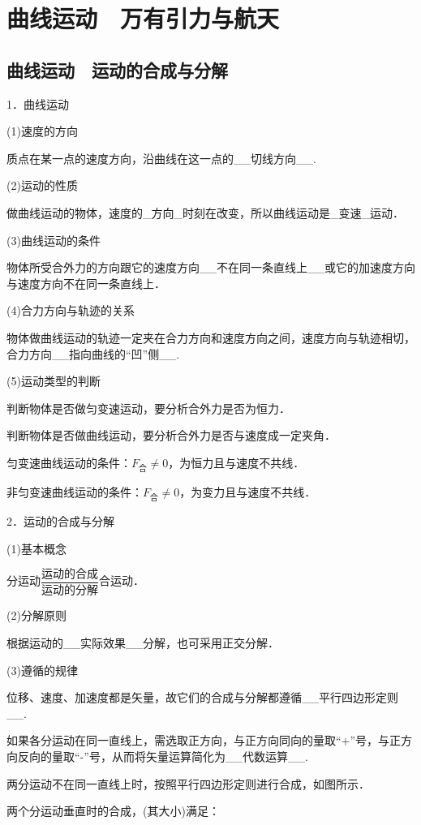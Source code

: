 \chapter{曲线运动　万有引力与航天}
\section{曲线运动　运动的合成与分解}


1．曲线运动

(1)速度的方向

质点在某一点的速度方向，沿曲线在这一点的\_\_切线方向\_\_.

(2)运动的性质

做曲线运动的物体，速度的\_方向\_时刻在改变，所以曲线运动是\_变速\_运动．

(3)曲线运动的条件

物体所受合外力的方向跟它的速度方向\_\_不在同一条直线上\_\_或它的加速度方向与速度方向不在同一条直线上．

(4)合力方向与轨迹的关系

物体做曲线运动的轨迹一定夹在合力方向和速度方向之间，速度方向与轨迹相切，合力方向\_\_指向曲线的``凹''侧\_\_.

(5)运动类型的判断

判断物体是否做匀变速运动，要分析合外力是否为恒力．

判断物体是否做曲线运动，要分析合外力是否与速度成一定夹角．

匀变速曲线运动的条件：$F_{\text{合}}\neq 0$，为恒力且与速度不共线．

非匀变速曲线运动的条件：$F_{\text{合}}\neq 0$，为变力且与速度不共线．

2．运动的合成与分解

(1)基本概念

分运动$\dfrac{\text{运动的合成}}{\text{运动的分解}}$合运动．

(2)分解原则

根据运动的\_\_实际效果\_\_分解，也可采用正交分解．

(3)遵循的规律

位移、速度、加速度都是矢量，故它们的合成与分解都遵循\_\_平行四边形定则\_\_.

如果各分运动在同一直线上，需选取正方向，与正方向同向的量取``+''号，与正方向反向的量取``-''号，从而将矢量运算简化为\_\_代数运算\_\_.

两分运动不在同一直线上时，按照平行四边形定则进行合成，如图所示．

两个分运动垂直时的合成，(其大小)满足：

